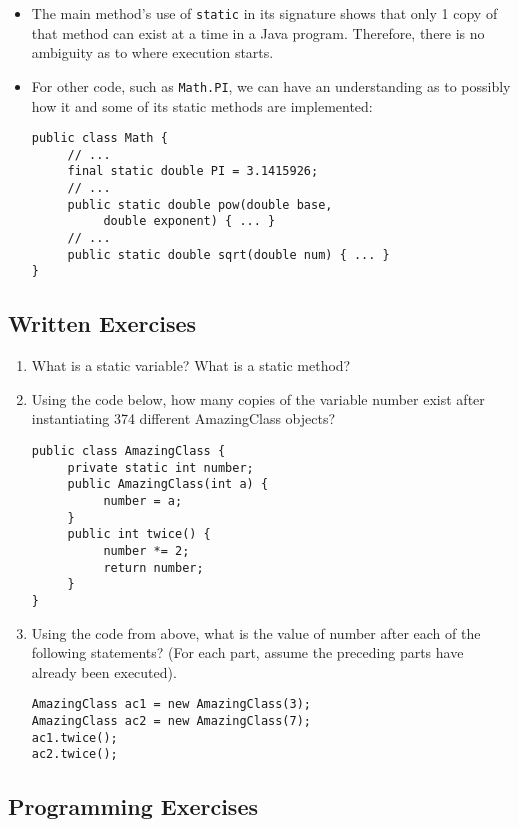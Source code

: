 \begin{itemize}
\item The main method's use of \verb|static| in its signature shows that only 1 copy of that method can exist at a time in a Java program. Therefore, there is no ambiguity as to where execution starts.
\item For other code, such as \verb|Math.PI|, we can have an understanding as to possibly how it and some of its static methods are implemented:
\begin{lstlisting}
public class Math {
     // ...
     final static double PI = 3.1415926;
     // ...
     public static double pow(double base,
          double exponent) { ... }
     // ...
     public static double sqrt(double num) { ... }
}
\end{lstlisting}

\end{itemize}

\subsection{Written Exercises}

\setcounter{counter}{1}
\begin{enumerate}[label={\arabic{counter}\addtocounter{counter}{1}}.]

\item What is a static variable? What is a static method?

\item Using the code below, how many copies of the variable number exist after instantiating 374 different AmazingClass objects?
\begin{lstlisting}
public class AmazingClass {
     private static int number;
     public AmazingClass(int a) {
          number = a;
     }
     public int twice() {
          number *= 2;
          return number;
     }
}
\end{lstlisting}

\item Using the code from above, what is the value of number after each of the following statements? (For each part, assume the preceding parts have already been executed).
\begin{lstlisting}
AmazingClass ac1 = new AmazingClass(3);
AmazingClass ac2 = new AmazingClass(7);
ac1.twice();
ac2.twice();
\end{lstlisting}

\end{enumerate}

\subsection{Programming Exercises}